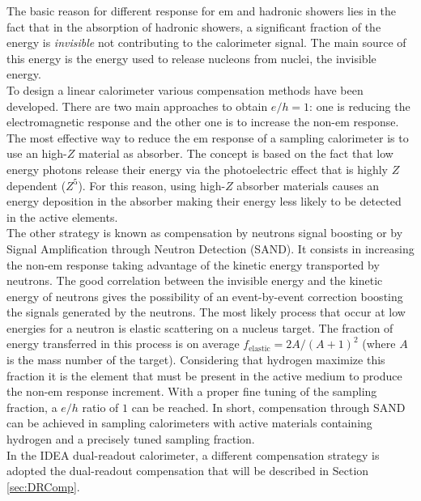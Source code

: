 The basic reason for different response for em and hadronic showers lies in the fact that in the absorption of hadronic showers, a significant fraction of the energy is \textit{invisible} not contributing to the calorimeter signal. The main source of this energy is the energy used to release nucleons from nuclei, the invisible energy.\\
To design a linear calorimeter various compensation methods have been developed. There are two main approaches to obtain $e/h = 1$: one is reducing the electromagnetic response and the other one is to increase the non-em response.\\
The most effective way to reduce the em response of a sampling calorimeter is to use an high-$Z$ material as absorber. The concept is based on the fact that low energy photons release their energy via the photoelectric effect that is highly $Z$ dependent ($Z^5$). For this reason, using high-$Z$ absorber materials causes an energy deposition in the absorber making their energy less likely to be detected in the active elements.\\
The other strategy is known as compensation by neutrons signal boosting or by Signal Amplification through Neutron Detection (SAND). It consists in increasing the non-em response taking advantage of the kinetic energy transported by neutrons. The good correlation between the invisible energy and the kinetic energy of neutrons gives the possibility of an event-by-event correction boosting the signals generated by the neutrons. The most likely process that occur at low energies for a neutron is elastic scattering on a nucleus target. The fraction of energy transferred in this process is on average $f_{\text{elastic}} = 2A / (A +1)^2$ (where $A$ is the mass number of the target). Considering that hydrogen maximize this fraction it is the element that must be present in the active medium to produce the non-em response increment. With a proper fine tuning of the sampling fraction, a $e/h$ ratio of $1$ can be reached.
In short, compensation through SAND can be achieved in sampling calorimeters with active materials containing hydrogen and a precisely tuned sampling fraction.\\
In the IDEA dual-readout calorimeter, a different compensation strategy is adopted the dual-readout compensation that will be described in Section \ref{sec:DRComp}.

